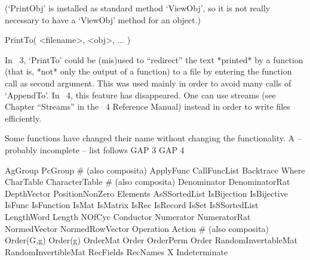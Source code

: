 (`PrintObj' is installed as standard method `ViewObj', so it is
not really necessary to have a `ViewObj' method for an object.)

\>PrintTo( <filename>, <obj>, ... )

In {\GAP}~3, `PrintTo' could be (mis)used to ``redirect'' the text
*printed* by a function (that is, *not* only the output of a function)
to a file by entering the function call as second argument.
This was used mainly in order to avoid many calls of `AppendTo'.
In {\GAP}~4, this feature has disappeared.
One can use streams (see Chapter ``Streams'' in the {\GAP}~4 Reference Manual)
instead in order to write files efficiently.

\break



Some functions have changed their name without changing the
functionality.
A -- probably incomplete -- list follows
\begintt
    GAP 3                   GAP 4
    
    AgGroup                 PcGroup            # (also composita)
    ApplyFunc               CallFuncList
    Backtrace               Where
    CharTable               CharacterTable     # (also composita)
    Denominator             DenominatorRat
    DepthVector             PositionNonZero
    Elements                AsSSortedList
    IsBijection             IsBijective
    IsFunc                  IsFunction
    IsMat                   IsMatrix
    IsRec                   IsRecord
    IsSet                   IsSSortedList
    LengthWord              Length
    NOfCyc                  Conductor
    Numerator               NumeratorRat
    NormedVector            NormedRowVector
    Operation               Action             # (also composita)
    Order(G,g)              Order(g)
    OrderMat                Order
    OrderPerm               Order
    RandomInvertableMat     RandomInvertibleMat
    RecFields               RecNames
    X                       Indeterminate
\endtt



